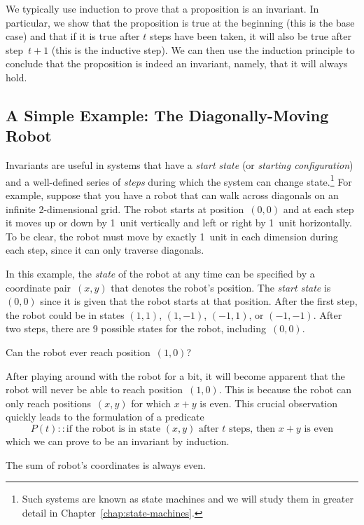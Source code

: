We typically use induction to prove that a proposition is an
invariant.  In particular, we show that the proposition is true at the
beginning (this is the base case) and that if it is true after $t$
steps have been taken, it will also be true after step~$t + 1$ (this
is the inductive step).  We can then use the induction principle to
conclude that the proposition is indeed an invariant, namely, that it will
always hold.

\subsection{A Simple Example: The Diagonally-Moving Robot}

Invariants are useful in systems that have a \emph{start state} (or
\emph{starting configuration}) and a well-defined series of
\emph{steps} during which
the system can change state.\footnote{Such systems are known as state
  machines and we will study them in greater detail in
  Chapter~\ref{chap:state-machines}.}  For example, suppose that you have a
robot that can walk across diagonals on an infinite 2-dimensional
grid.  The robot starts at position~$(0, 0)$ and at each step it moves
up or down by 1~unit vertically and left or right by 1~unit
horizontally.  To be clear, the robot must move by exactly 1~unit in
each dimension during each step, since it can only traverse diagonals.

In this example, the \emph{state} of the robot at any time can be
specified by a coordinate pair~$(x, y)$ that denotes the robot's
position.  The \emph{start state} is~$(0, 0)$ since it is given that
the robot starts at that position.  After the first step, the robot
could be in states $(1, 1)$, $(1, -1)$, $(-1, 1)$, or $(-1, -1)$.
After two steps, there are 9 possible states for the robot,
including~$(0, 0)$.

Can the robot ever reach position~$(1, 0)$?

After playing around with the robot for a bit, it will become apparent
that the robot will never be able to reach position~$(1, 0)$.  This is
because the robot can only reach positions~$(x, y)$ for which $x + y$
is even.  This crucial observation quickly leads to the formulation of
a predicate
\begin{equation*}
    P(t) :: \text{if the robot is in state $(x, y)$ after $t$ steps,
      then $x + y$ is even}
\end{equation*}
which we can prove to be an invariant by induction.

\begin{theorem}\label{th:diag-robot}
The sum of robot's coordinates is always even.
\end{theorem}

